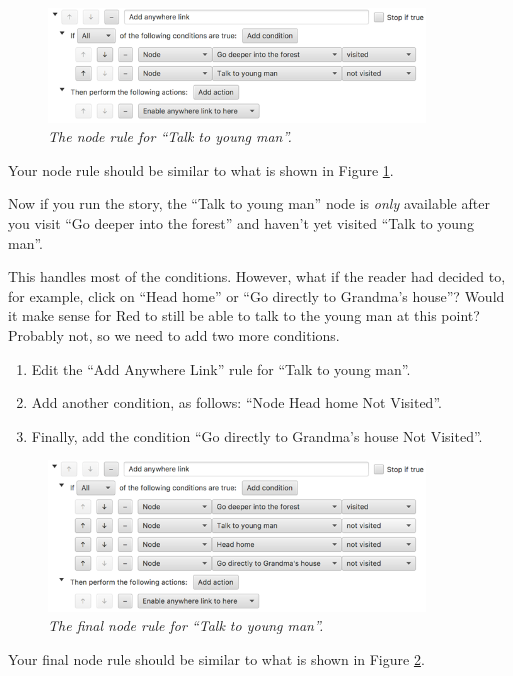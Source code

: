 \documentclass{article}
\begin{document}
\begin{figure}[h]
  \centering
  \includegraphics[width=10cm]{images/hypedyn-tutorial-3-figure-6}
  \caption{\textit{The node rule for ``Talk to young man''.}}
  \label{fig:tut3:talk}
\end{figure} 

Your node rule should be similar to what is shown in Figure \ref{fig:tut3:talk}.

Now if you run the story, the ``Talk to young man'' node is \textit{only}
available after you visit ``Go deeper into the forest'' and haven't yet
visited ``Talk to young man''.

This handles most of the conditions. However, what if the reader had decided to, for example, click on ``Head home'' or ``Go directly to Grandma's house''? Would it make sense for Red to still be able to talk to the young man at this point? Probably not, so we need to add two more conditions.

\begin{enumerate}
  \item Edit the ``Add Anywhere Link'' rule for ``Talk to young man''.
  \item Add another condition, as follows: ``Node Head home Not
  Visited''.
  \item Finally, add the condition ``Go directly to Grandma's house Not
  Visited''.
\end{enumerate}

\begin{figure}[h]
  \centering
  \includegraphics[width=10cm]{images/hypedyn-tutorial-3-figure-7}
  \caption{\textit{The final node rule for ``Talk to young man''.}}
  \label{fig:tut3:talk_final}
\end{figure} 

Your final node rule should be similar to what is shown in Figure
\ref{fig:tut3:talk_final}.
\end{document}
